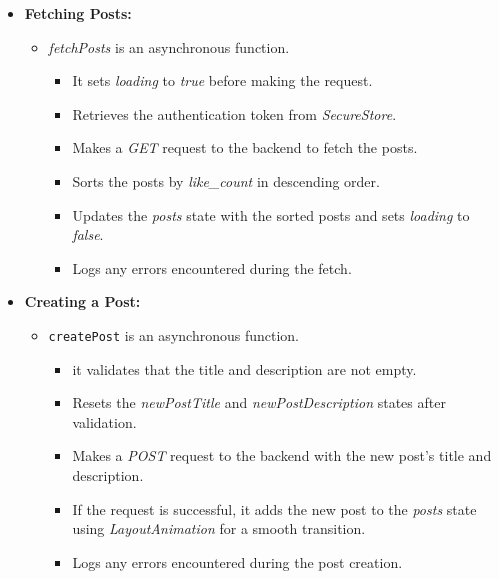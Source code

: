 \begin{itemize}
    \item \textbf{Fetching Posts:}
    \begin{itemize}
        \item \textit{fetchPosts} is an asynchronous function.
        \begin{itemize}
            \item It sets \textit{loading} to \textit{true} before making the request.
            \item Retrieves the authentication token from \textit{SecureStore}.
            \item Makes a \textit{GET} request to the backend to fetch the posts.
            \item Sorts the posts by \textit{like\_count} in descending order.
            \item Updates the \textit{posts} state with the sorted posts and sets \textit{loading} to \textit{false}.
            \item Logs any errors encountered during the fetch.
        \end{itemize}
    \end{itemize}

    \item \textbf{Creating a Post:}
    \begin{itemize}
        \item \texttt{createPost} is an asynchronous function.
        \begin{itemize}
            \item it validates that the title and description are not empty.
            \item Resets the \textit{newPostTitle} and \textit{newPostDescription} states after validation.
            \item Makes a \textit{POST} request to the backend with the new post's title and description.
            \item If the request is successful, it adds the new post to the \textit{posts} state using \textit{LayoutAnimation} for a smooth transition.
            \item Logs any errors encountered during the post creation.
        \end{itemize}
    \end{itemize}


\end{itemize}
